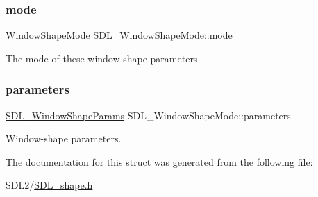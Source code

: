 \subsubsection{\texorpdfstring{mode}{mode}}
{\footnotesize\ttfamily \hyperlink{_s_d_l__shape_8h_aa30948f2699e316a43b740eccebe5c20}{Window\+Shape\+Mode} S\+D\+L\+\_\+\+Window\+Shape\+Mode\+::mode}



The mode of these window-\/shape parameters. 

\mbox{\label{struct_s_d_l___window_shape_mode_a2f79bb294034156207fa6d88d3a8c819}} 
\subsubsection{\texorpdfstring{parameters}{parameters}}
{\footnotesize\ttfamily \hyperlink{union_s_d_l___window_shape_params}{S\+D\+L\+\_\+\+Window\+Shape\+Params} S\+D\+L\+\_\+\+Window\+Shape\+Mode\+::parameters}



Window-\/shape parameters. 



The documentation for this struct was generated from the following file\+:\begin{DoxyCompactItemize}
\item 
S\+D\+L2/\hyperlink{_s_d_l__shape_8h}{S\+D\+L\+\_\+shape.\+h}\end{DoxyCompactItemize}
